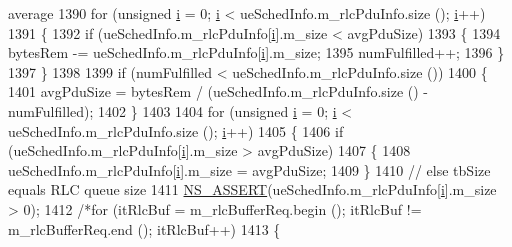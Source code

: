 \begin{DoxyCode}
{       average}
1390                         \textcolor{keywordflow}{for} (\textcolor{keywordtype}{unsigned} \hyperlink{bernuolliDistribution_8m_a6f6ccfcf58b31cb6412107d9d5281426}{i} = 0; \hyperlink{bernuolliDistribution_8m_a6f6ccfcf58b31cb6412107d9d5281426}{i} < ueSchedInfo.m\_rlcPduInfo.size (); 
      \hyperlink{bernuolliDistribution_8m_a6f6ccfcf58b31cb6412107d9d5281426}{i}++)
1391                         \{
1392                                 \textcolor{keywordflow}{if} (ueSchedInfo.m\_rlcPduInfo[\hyperlink{bernuolliDistribution_8m_a6f6ccfcf58b31cb6412107d9d5281426}{i}].m\_size < avgPduSize)
1393                                 \{
1394                                         bytesRem -= ueSchedInfo.m\_rlcPduInfo[\hyperlink{bernuolliDistribution_8m_a6f6ccfcf58b31cb6412107d9d5281426}{i}].m\_size;
1395                                         numFulfilled++;
1396                                 \}
1397                         \}
1398 
1399                         \textcolor{keywordflow}{if} (numFulfilled < ueSchedInfo.m\_rlcPduInfo.size ())
1400                         \{
1401                                 avgPduSize = bytesRem / (ueSchedInfo.m\_rlcPduInfo.size () - numFulfilled);
1402                         \}
1403 
1404                         \textcolor{keywordflow}{for} (\textcolor{keywordtype}{unsigned} \hyperlink{bernuolliDistribution_8m_a6f6ccfcf58b31cb6412107d9d5281426}{i} = 0; \hyperlink{bernuolliDistribution_8m_a6f6ccfcf58b31cb6412107d9d5281426}{i} < ueSchedInfo.m\_rlcPduInfo.size (); 
      \hyperlink{bernuolliDistribution_8m_a6f6ccfcf58b31cb6412107d9d5281426}{i}++)
1405                         \{
1406                                 \textcolor{keywordflow}{if} (ueSchedInfo.m\_rlcPduInfo[\hyperlink{bernuolliDistribution_8m_a6f6ccfcf58b31cb6412107d9d5281426}{i}].m\_size > avgPduSize)
1407                                 \{
1408                                         ueSchedInfo.m\_rlcPduInfo[\hyperlink{bernuolliDistribution_8m_a6f6ccfcf58b31cb6412107d9d5281426}{i}].m\_size = avgPduSize;
1409                                 \}
1410                                 \textcolor{comment}{// else tbSize equals RLC queue size}
1411                                 \hyperlink{assert_8h_a6dccdb0de9b252f60088ce281c49d052}{NS\_ASSERT}(ueSchedInfo.m\_rlcPduInfo[\hyperlink{bernuolliDistribution_8m_a6f6ccfcf58b31cb6412107d9d5281426}{i}].m\_size > 0);
1412                                 \textcolor{comment}{/*for (itRlcBuf = m\_rlcBufferReq.begin (); itRlcBuf != m\_rlcBufferReq.end
       (); itRlcBuf++)}
1413 \textcolor{comment}{                                \{}

\end{DoxyCode}
